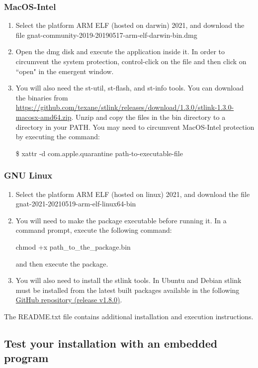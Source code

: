 \subsubsection*{MacOS-Intel}
\begin{enumerate}
\item Select the platform ARM ELF (hosted on darwin) 2021, and download the file gnat-community-2019-20190517-arm-elf-darwin-bin.dmg
\item Open the dmg disk and execute the application inside it. In order to circumvent the system protection, control-click on the file and then click on ``open" in the emergent window.
\item You will also need the st-util,  st-flash, and st-info tools. You can download the binaries from 
\url{https://github.com/texane/stlink/releases/download/1.3.0/stlink-1.3.0-macosx-amd64.zip}. Unzip and copy the files in the bin directory to a directory in your PATH. You may need to circumvent MacOS-Intel protection by executing the command:

	\$ xattr -d com.apple.quarantine path-to-executable-file
\end{enumerate}
\subsubsection*{GNU Linux}
\begin{enumerate}
\item Select the platform ARM ELF (hosted on linux) 2021, and download the file gnat-2021-20210519-arm-elf-linux64-bin
\item You will need to make the package executable before running it. In a command prompt, execute the following command:

     chmod +x path\_to\_the\_package.bin

and then execute the package.
\item You will also need to install the stlink tools. In Ubuntu and Debian stlink must be installed from the latest built packages available in the following \href{https://github.com/stlink-org/stlink/releases/latest}{GitHub repository (release v1.8.0)}.
\end{enumerate}

The README.txt file contains additional installation and execution instructions.

\subsection{Test your installation with an embedded program}


